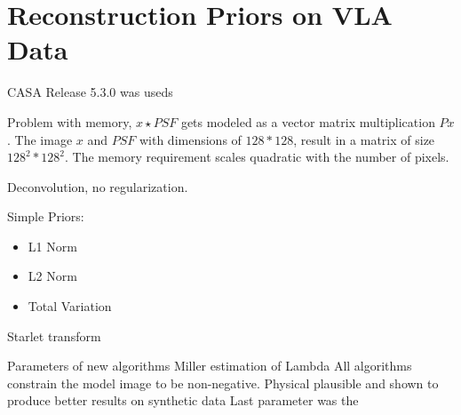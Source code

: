 \section{Reconstruction Priors on VLA Data}

CASA Release 5.3.0 was useds


Problem with memory, $x \star PSF$ gets modeled as a vector matrix multiplication $Px$. The image $x$ and $PSF$ with dimensions of $128 * 128$, result in a matrix of size $128^2 * 128^2$. The memory requirement scales quadratic with the number of pixels. 


Deconvolution, no regularization.

Simple Priors:
\begin{itemize}
	\item L1 Norm
	\item L2 Norm
	\item Total Variation
\end{itemize}

Starlet transform


Parameters of new algorithms
Miller estimation of Lambda \cite{miller1970least}
All algorithms constrain the model image to be non-negative. Physical plausible and shown to produce better results on synthetic data \cite{mcewen2011compressed}
Last parameter was the 


